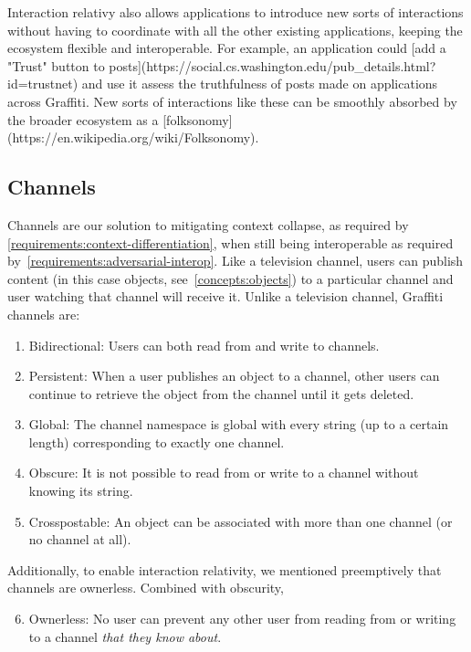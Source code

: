Interaction relativy also allows applications to introduce new sorts of interactions
without having to coordinate with all the other existing applications,
keeping the ecosystem flexible and interoperable.
For example, an application could [add a "Trust" button to posts](https://social.cs.washington.edu/pub_details.html?id=trustnet)
and use it assess the truthfulness of posts made on applications across Graffiti.
New sorts of interactions like these can be smoothly absorbed by the broader ecosystem
as a [folksonomy](https://en.wikipedia.org/wiki/Folksonomy).

\subsection{Channels}
\label{concepts:channels}

Channels are our solution to mitigating context collapse, as required by
\ref{requirements:context-differentiation}, when still being
interoperable as required by~\ref{requirements:adversarial-interop}.
Like a television channel, users can publish content (in this case
objects, see~\ref{concepts:objects}) to a particular channel
and user watching that channel will receive it.
Unlike a television channel, Graffiti channels are:
\begin{enumerate}
\item
Bidirectional: Users can both read from and write to channels.
\item
Persistent: When a user publishes an object to a channel, other users can
continue to retrieve the object from the channel until it gets deleted.
\item
Global: The channel namespace is global with every string (up to a certain length)
corresponding to exactly one channel.
\item
Obscure: It is not possible to read from or write to a channel without knowing
its string.
\item
Crosspostable: An object can be associated with more than one channel (or no channel at all).
\end{enumerate}

Additionally, to enable interaction relativity, we mentioned preemptively that channels are ownerless.
Combined with obscurity,

\begin{enumerate}
\setcounter{enumi}{5}
\item
Ownerless: No user can prevent any other user from reading from or writing to a channel
\emph{that they know about}.
\end{enumerate}

